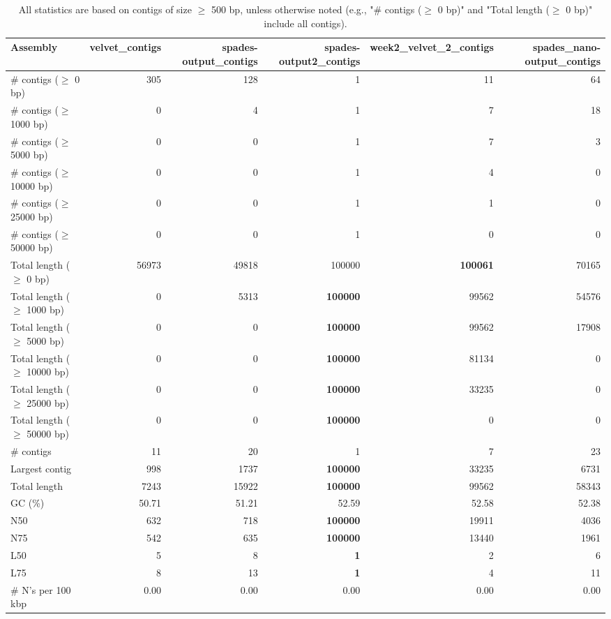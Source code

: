 \documentclass[12pt,a4paper]{article}
\begin{document}
\begin{table}[ht]
\begin{center}
\caption{All statistics are based on contigs of size $\geq$ 500 bp, unless otherwise noted (e.g., "\# contigs ($\geq$ 0 bp)" and "Total length ($\geq$ 0 bp)" include all contigs).}
\begin{tabular}{|l*{5}{|r}|}
\hline
Assembly & velvet\_contigs & spades-output\_contigs & spades-output2\_contigs & week2\_velvet\_2\_contigs & spades\_nano-output\_contigs \\ \hline
\# contigs ($\geq$ 0 bp) & 305 & 128 & 1 & 11 & 64 \\ \hline
\# contigs ($\geq$ 1000 bp) & 0 & 4 & 1 & 7 & 18 \\ \hline
\# contigs ($\geq$ 5000 bp) & 0 & 0 & 1 & 7 & 3 \\ \hline
\# contigs ($\geq$ 10000 bp) & 0 & 0 & 1 & 4 & 0 \\ \hline
\# contigs ($\geq$ 25000 bp) & 0 & 0 & 1 & 1 & 0 \\ \hline
\# contigs ($\geq$ 50000 bp) & 0 & 0 & 1 & 0 & 0 \\ \hline
Total length ($\geq$ 0 bp) & 56973 & 49818 & 100000 & {\bf 100061} & 70165 \\ \hline
Total length ($\geq$ 1000 bp) & 0 & 5313 & {\bf 100000} & 99562 & 54576 \\ \hline
Total length ($\geq$ 5000 bp) & 0 & 0 & {\bf 100000} & 99562 & 17908 \\ \hline
Total length ($\geq$ 10000 bp) & 0 & 0 & {\bf 100000} & 81134 & 0 \\ \hline
Total length ($\geq$ 25000 bp) & 0 & 0 & {\bf 100000} & 33235 & 0 \\ \hline
Total length ($\geq$ 50000 bp) & 0 & 0 & {\bf 100000} & 0 & 0 \\ \hline
\# contigs & 11 & 20 & 1 & 7 & 23 \\ \hline
Largest contig & 998 & 1737 & {\bf 100000} & 33235 & 6731 \\ \hline
Total length & 7243 & 15922 & {\bf 100000} & 99562 & 58343 \\ \hline
GC (\%) & 50.71 & 51.21 & 52.59 & 52.58 & 52.38 \\ \hline
N50 & 632 & 718 & {\bf 100000} & 19911 & 4036 \\ \hline
N75 & 542 & 635 & {\bf 100000} & 13440 & 1961 \\ \hline
L50 & 5 & 8 & {\bf 1} & 2 & 6 \\ \hline
L75 & 8 & 13 & {\bf 1} & 4 & 11 \\ \hline
\# N's per 100 kbp & 0.00 & 0.00 & 0.00 & 0.00 & 0.00 \\ \hline
\end{tabular}
\end{center}
\end{table}
\end{document}

